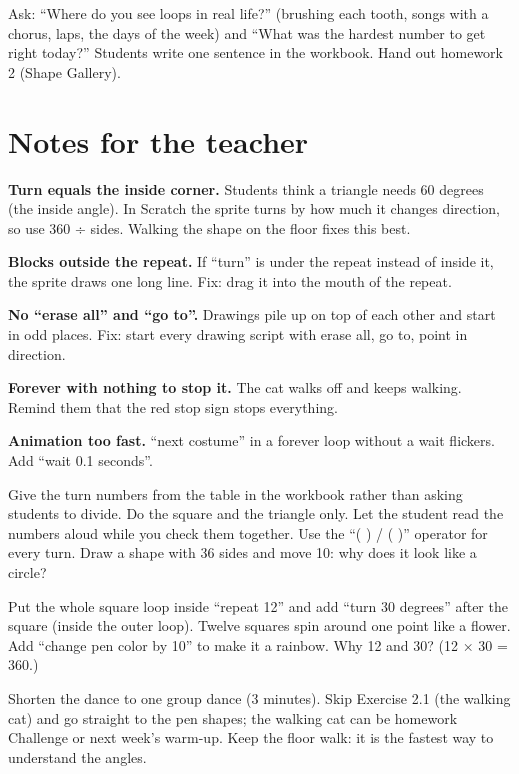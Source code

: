 \begin{reflection}
Ask: \enquote{Where do you see loops in real life?} (brushing each tooth, songs with a chorus, laps, the days of the week) and \enquote{What was the hardest number to get right today?} Students write one sentence in the workbook. Hand out homework 2 (Shape Gallery).
\end{reflection}

\section{Notes for the teacher}
\begin{commonmistakes}
  \item \textbf{Turn equals the inside corner.} Students think a triangle needs 60 degrees (the inside angle). In Scratch the sprite turns by how much it changes direction, so use 360 ÷ sides. Walking the shape on the floor fixes this best.
  \item \textbf{Blocks outside the repeat.} If \enquote{turn} is under the repeat instead of inside it, the sprite draws one long line. Fix: drag it into the mouth of the repeat.
  \item \textbf{No \enquote{erase all} and \enquote{go to}.} Drawings pile up on top of each other and start in odd places. Fix: start every drawing script with erase all, go to, point in direction.
  \item \textbf{Forever with nothing to stop it.} The cat walks off and keeps walking. Remind them that the red stop sign stops everything.
  \item \textbf{Animation too fast.} \enquote{next costume} in a forever loop without a wait flickers. Add \enquote{wait 0.1 seconds}.
\end{commonmistakes}

\begin{differentiation}
\supportpath Give the turn numbers from the table in the workbook rather than asking students to divide. Do the square and the triangle only. Let the student read the numbers aloud while you check them together.
\extensionpath Use the \enquote{( ) / ( )} operator for every turn. Draw a shape with 36 sides and move 10: why does it look like a circle?
\end{differentiation}

\begin{stretchchallenge}
Put the whole square loop inside \enquote{repeat 12} and add \enquote{turn 30 degrees} after the square (inside the outer loop). Twelve squares spin around one point like a flower. Add \enquote{change pen color by 10} to make it a rainbow. Why 12 and 30? (12 × 30 = 360.)
\end{stretchchallenge}

\begin{teachernote}
Shorten the dance to one group dance (3 minutes). Skip Exercise 2.1 (the walking cat) and go straight to the pen shapes; the walking cat can be homework Challenge or next week's warm-up. Keep the floor walk: it is the fastest way to understand the angles.
\end{teachernote}
